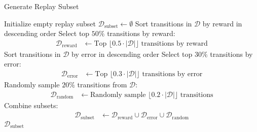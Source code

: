 \documentclass[12pt]{article}
\begin{document}
\begin{algorithm}[H]
\caption{Generate Replay Subset}
\begin{algorithmic}[1]
\State Initialize empty replay subset $\mathcal{D}_{\text{subset}} \leftarrow \emptyset$
\State Sort transitions in $\mathcal{D}$ by reward in descending order
\State Select top $50\%$ transitions by reward:
\begin{align*}
    \mathcal{D}_{\text{reward}} &\gets \text{Top } \lfloor 0.5 \cdot |\mathcal{D}| \rfloor \text{ transitions by reward}
\end{align*}
\State Sort transitions in $\mathcal{D}$ by error in descending order
\State Select top $30\%$ transitions by error:
\begin{align*}
    \mathcal{D}_{\text{error}} &\gets \text{Top } \lfloor 0.3 \cdot |\mathcal{D}| \rfloor \text{ transitions by error}
\end{align*}
\State Randomly sample $20\%$ transitions from $\mathcal{D}$:
\begin{align*}
    \mathcal{D}_{\text{random}} &\gets \text{Randomly sample } \lfloor 0.2 \cdot |\mathcal{D}| \rfloor \text{ transitions}
\end{align*}
\State Combine subsets:
\begin{align*}
    \mathcal{D}_{\text{subset}} &\gets \mathcal{D}_{\text{reward}} \cup \mathcal{D}_{\text{error}} \cup \mathcal{D}_{\text{random}}
\end{align*}
\State \Return $\mathcal{D}_{\text{subset}}$
\end{algorithmic}
\end{algorithm}
\end{document}
